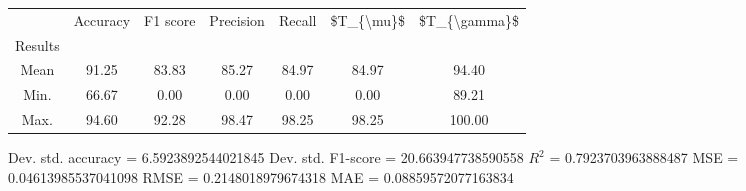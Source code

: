 \begin{tabular}{|c|c|c|c|c|c|c|}
\toprule
{} &  Accuracy &  F1 score &  Precision &  Recall &  \$T\_\{\textbackslash mu\}\$ &  \$T\_\{\textbackslash gamma\}\$ \\
Results &           &           &            &         &            &               \\
\hline
Mean    &     91.25 &     83.83 &      85.27 &   84.97 &      84.97 &         94.40 \\
Min.    &     66.67 &      0.00 &       0.00 &    0.00 &       0.00 &         89.21 \\
Max.    &     94.60 &     92.28 &      98.47 &   98.25 &      98.25 &        100.00 \\
\bottomrule
\end{tabular}

 Dev. std. accuracy = 6.5923892544021845
 Dev. std. F1-score = 20.663947738590558
 $R^2$ = 0.7923703963888487
 MSE = 0.04613985537041098
 RMSE = 0.2148018979674318
 MAE = 0.08859572077163834